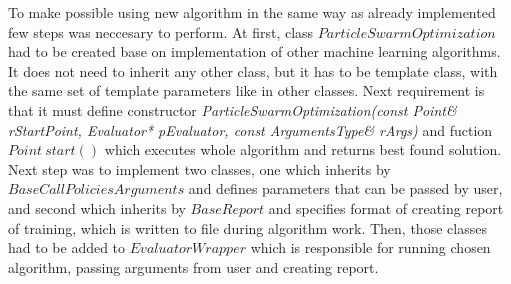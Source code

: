 To make possible using new algorithm in the same way as already implemented few steps was neccesary to perform.
At first, class \(ParticleSwarmOptimization\) had to be created base on implementation of other machine learning algorithms. 
It does not need to inherit any other class, but it has to be template class, with the same set of template parameters like in other classes. 
Next requirement is that it must define constructor \textit{ParticleSwarmOptimization(const Point\& rStartPoint, Evaluator* pEvaluator, const ArgumentsType\& rArgs)} 
and fuction \(Point\ start()\) which executes whole algorithm and returns best found solution.
Next step was to implement two classes, one which inherits by \(BaseCallPoliciesArguments\) and defines parameters that can be passed by user, 
and second which inherits by \(BaseReport\) and specifies format of creating report of training, which is written to file during algorithm work.
Then, those classes had to be added to \(EvaluatorWrapper\) which is responsible for running chosen algorithm, 
passing arguments from user and creating report.






        

        
        


